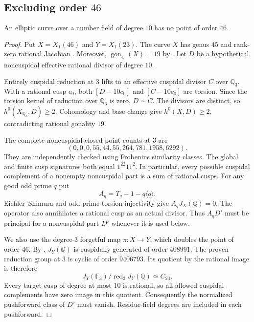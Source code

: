 \subsection{Excluding order $46$}\label{sec:d31a46}
\begin{proposition}\label{prop:decic46-exclusion}
An elliptic curve over a number field of degree $10$ has no point of order $46$.
\end{proposition}
\begin{proof}
Put $X=X_1(46)$ and $Y=X_1(23)$.
The curve $X$ has genus $45$ and rank-zero rational Jacobian
\cite[Theorem~3.1]{DEHMZ}.
Moreover, $\operatorname{gon}_{\mathbb Q}(X)=19$ by
\cite[Theorem~D]{Varivoda26}.
Let $D$ be a hypothetical noncuspidal effective rational divisor of degree $10$.

Entirely cuspidal reduction at $3$ lifts to an effective cuspidal divisor $C$
over $\mathbb Q_3$.
With a rational cusp $c_0$, both $[D-10c_0]$ and $[C-10c_0]$ are torsion.
Since the torsion kernel of reduction over $\mathbb Q_3$ is zero, $D\sim C$.
The divisors are distinct, so $h^0(X_{\mathbb Q_3},D)\ge2$.
Cohomology and base change give $h^0(X,D)\ge2$, contradicting rational gonality $19$.

The complete noncuspidal closed-point counts at $3$ are
\[
 (0,0,0,55,44,55,264,781,1958,6292).
\]
They are independently checked using Frobenius similarity classes.
The global and finite cusp signatures both equal $1^{22}11^2$.
In particular, every possible cuspidal complement of a nonempty
noncuspidal part is a sum of rational cusps.
For any good odd prime $q$ put
\[
 A_q=T_q-1-q\langle q\rangle.
\]
Eichler--Shimura and odd-prime torsion injectivity give $A_qJ_X(\mathbb Q)=0$.
The operator also annihilates a rational cusp as an actual divisor.
Thus $A_qD'$ must be principal for a noncuspidal part $D'$ whenever it is used below.

We also use the degree-$3$ forgetful map
$\pi:X\longrightarrow Y$, which doubles the point of order $46$.
By \cite[Theorems~3.1 and~4.13, Table~2]{DEHMZ},
$J_Y(\mathbb Q)$ is cuspidally generated of order $408991$.
The proven reduction group at $3$ is cyclic of order $9406793$.
Its quotient by the rational image is therefore
\[
 J_Y(\mathbb F_3)/\operatorname{red}_3J_Y(\mathbb Q)\simeq C_{23}.
\]
Every target cusp of degree at most $10$ is rational, so all allowed
cuspidal complements have zero image in this quotient.
Consequently the normalized pushforward class of $D'$ must vanish.
Residue-field degrees are included in each pushforward.


\end{proof}
